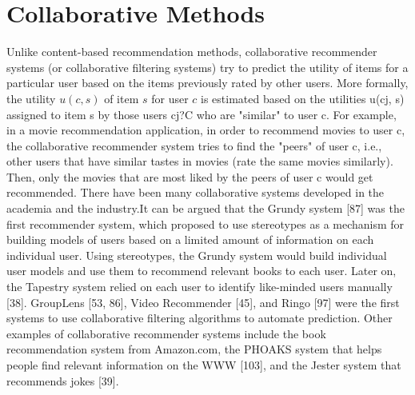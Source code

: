 \section{Collaborative Methods}
Unlike content-based recommendation methods, collaborative recommender systems (or collaborative filtering systems) try to predict the utility of items for a particular user based on the items previously rated by other users. More formally, the utility $u(c, s)$ of item $s$ for user $c$ is estimated based on the utilities u(cj, s) assigned to item s by those users cj?C who are "similar" to user c. For example, in a movie recommendation application, in order to recommend movies to user c, the collaborative recommender system tries to find the "peers" of user c, i.e., other users that have similar tastes in movies (rate the same movies similarly). Then, only the movies that are most liked by the peers of user c would get recommended.
There have been many collaborative systems developed in the academia and the industry.It can be argued that the Grundy system [87] was the first recommender system, which proposed to use stereotypes as a mechanism for building models of users based on a limited amount of information on each individual user. Using stereotypes, the Grundy system would build individual user models and use them to recommend relevant books to each user. Later on, the Tapestry system relied on each user to identify like-minded users manually [38]. GroupLens [53, 86], Video Recommender [45], and Ringo [97] were the first systems to use collaborative filtering algorithms to automate prediction. Other examples of collaborative recommender systems include the book recommendation system from Amazon.com, the PHOAKS system that helps people find relevant information on the WWW [103], and the Jester system that recommends jokes [39].

